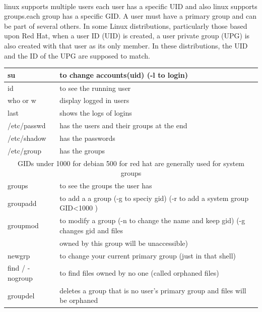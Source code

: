 \documentclass[10pt]{article}
\begin{document}
\paragraph{}
linux supports multiple users each user has a specific UID and also linux supports groups.each group has a specific GID.
A user must have a primary group and can be part of several others.
In some Linux distributions, particularly those based upon Red Hat, when a user ID (UID) is created, a user private group (UPG) is also created with that user as its only member. In these distributions, the UID and the ID of the UPG are supposed to match.
\begin{center}
	\begin{tabular}{|l|l|}

		\hline su& to change accounts(uid) (-l to login)\\
		\hline id& to see the running user\\
		\hline who or w &display logged in users\\
		\hline last  & shows the logs of logins\\
		\hline /etc/passwd & has the users and their groups at the end\\
		\hline /etc/shadow & has the passwords\\
		\hline /etc/group & has the groups\\
		\hline  \multicolumn{2}{|c|}{GIDs under 1000 for debian 500 for red hat are generally used for system groups} \\
		\hline groups & to see the groups the user has\\
		\hline groupadd & to add a a group (-g to speciy gid) (-r to add a system group GID\textless 1000 )\\
		\hline groupmod & to modify a group (-n to change the name and keep gid) (-g changes gid and files \\
						&owned by this group will be unaccessible)\\
		\hline newgrp & to change your current primary group (just in that shell)\\
		\hline find / -nogroup & to find files owned by no one (called orphaned files)\\
		\hline groupdel & deletes a group that is no user's primary group and files will be orphaned\\
		\hline
	\end{tabular}
\end{center}
\end{document}
